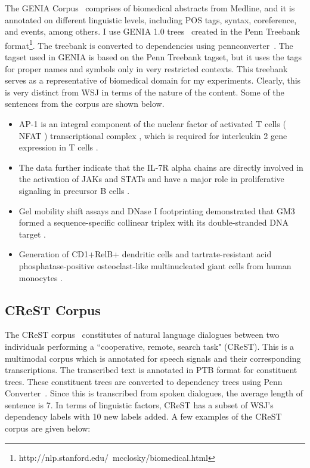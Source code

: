 The GENIA Corpus~\citep{tateisi:tsujii:04} comprises of biomedical abstracts from Medline, and it is annotated on different linguistic levels, including POS tags, syntax, coreference, and events, among others. I use GENIA 1.0 trees~\cite{Ohta:2002:GCA:1289189.1289260} created in the Penn Treebank format\footnote{http://nlp.stanford.edu/~mcclosky/biomedical.html}. The treebank is converted to dependencies using pennconverter~\cite{johansson2007a}. The tagset used in GENIA is based on the Penn Treebank tagset, but it uses the tags for proper names and symbols only in very restricted contexts. This treebank serves as a representative of biomedical domain for my experiments. Clearly, this is very distinct from WSJ in terms of the nature of the content. Some of the sentences from the corpus are shown below.~
\begin{itemize}
    \item AP-1 is an integral component of the nuclear factor of activated T cells ( NFAT ) transcriptional complex , which is required for interleukin 2 gene expression in T cells .
    \item The data further indicate that the IL-7R alpha chains are directly involved in the activation of JAKs and STATs and have a major role in proliferative signaling in precursor B cells .
    \item Gel mobility shift assays and DNase I footprinting demonstrated that GM3 formed a sequence-specific collinear triplex with its double-stranded DNA target .
    \item Generation of CD1+RelB+ dendritic cells and tartrate-resistant acid phosphatase-positive osteoclast-like multinucleated giant cells from human monocytes . 
\end{itemize}

\subsection{CReST Corpus}

The CReST corpus~\citep{eberhard2010indiana} constitutes of natural language dialogues between two individuals performing a ``cooperative, remote, search task" (CReST). This is a multimodal corpus which is annotated for speech signals and their corresponding transcriptions. The transcribed text is annotated in PTB format for constituent trees. These constituent trees are converted to dependency trees using Penn Converter~\citep{johansson2007a}. Since this is transcribed from spoken dialogues, the average length of sentence is 7. In terms of linguistic factors, CReST has a subset of WSJ's dependency labels with 10 new labels added. A few examples of the CReST corpus are given below:

